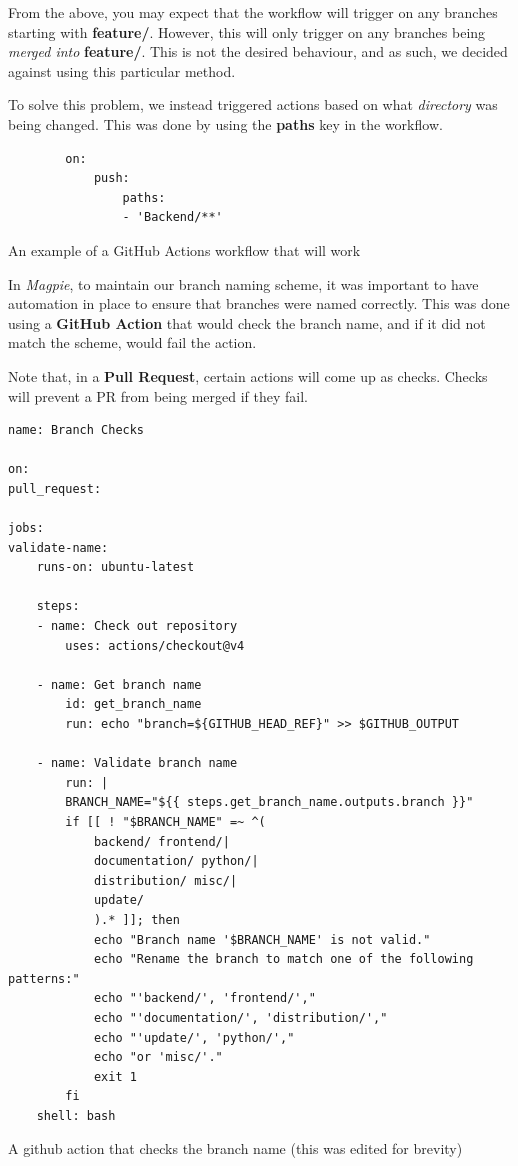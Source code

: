 \documentclass[preview]{standalone}
\begin{document}
From the above, you may expect that the workflow will trigger on any branches
starting with \textbf{feature/}. However, this will only trigger on any branches
being \textit{merged into} \textbf{feature/}. This is not the desired behaviour,
and as such, we decided against using this particular method.

To solve this problem, we instead triggered actions based on what \textit{directory} was
being changed. This was done by using the \textbf{paths} key in the workflow.

\begin{listing}[htbp]
    \centering{}
    \begin{minipage}{0.85\textwidth}
    \begin{verbatim}
        on:
            push:
                paths:
                - 'Backend/**'
    \end{verbatim}
    \end{minipage}
    \caption{An example of a GitHub Actions workflow that will work}
\end{listing}

\newpage{}

In \textit{Magpie}, to maintain our branch naming scheme, it was important to
have automation in place to ensure that branches were named correctly. This was
done using a \textbf{GitHub Action} that would check the branch name, and if it
did not match the scheme, would fail the action.

Note that, in a \textbf{Pull Request}, certain actions will come up as checks. 
Checks will prevent a PR from being merged if they fail.

\begin{listing}[htbp]
    \begin{verbatim}
name: Branch Checks

on:
pull_request:

jobs:
validate-name:
    runs-on: ubuntu-latest

    steps:
    - name: Check out repository
        uses: actions/checkout@v4

    - name: Get branch name
        id: get_branch_name
        run: echo "branch=${GITHUB_HEAD_REF}" >> $GITHUB_OUTPUT

    - name: Validate branch name
        run: |
        BRANCH_NAME="${{ steps.get_branch_name.outputs.branch }}"
        if [[ ! "$BRANCH_NAME" =~ ^(
            backend/ frontend/|
            documentation/ python/|
            distribution/ misc/|
            update/
            ).* ]]; then
            echo "Branch name '$BRANCH_NAME' is not valid."
            echo "Rename the branch to match one of the following patterns:"
            echo "'backend/', 'frontend/',"
            echo "'documentation/', 'distribution/',"
            echo "'update/', 'python/',"
            echo "or 'misc/'."
            exit 1
        fi
    shell: bash
    \end{verbatim}
    \caption{A github action that checks the branch name (this was edited for brevity)}
\end{listing}
\end{document}
